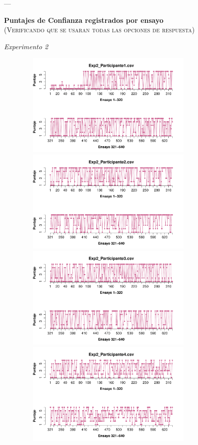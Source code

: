 \documentclass[a4paper ]{article}
\begin{document}
---
\vspace{3mm}
\begin{center}
{\LARGE \textbf{Puntajes de Confianza registrados por ensayo}}\\
{\small \textsc{(Verificando que se usaran todas las opciones de respuesta)}}\\
\smallskip
\end{center}
\begin{center}
{\LARGE \textit{Experimento 2}}\\
\end{center}
\vspace{3mm}
\begin{figure}[th]
\centering
\includegraphics[width=9cm, height=5cm]{Figures/Rating_Exp2_P1} \includegraphics[width=9cm, height=5cm]{Figures/Rating_Exp2_P2} 
\includegraphics[width=9cm, height=5cm]{Figures/Rating_Exp2_P3} \includegraphics[width=9cm, height=5cm]{Figures/Rating_Exp2_P4} 

\end{figure}
\end{document}
